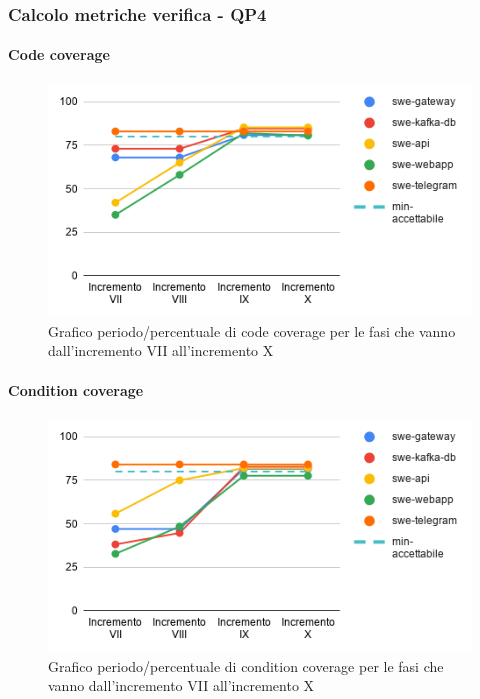 \subsubsection{Calcolo metriche verifica - QP4}	
\paragraph{Code coverage}
\begin{figure}[H]
			\centering
			\includegraphics[width=0.8\linewidth]{./res/images/QM-TEST-1-COCO.png}
			\caption{Grafico periodo/percentuale di code coverage per le fasi che vanno dall'incremento VII all'incremento X}
			\label{fig:Grafico periodo/percentuale di code coverage per le fasi che vanno dall'incremento VII all'incremento X}
	\end{figure}
\paragraph{Condition coverage}
\begin{figure}[H]
			\centering
			\includegraphics[width=0.8\linewidth]{./res/images/QM-TEST-2-CONCO.png}
			\caption{Grafico periodo/percentuale di condition coverage per le fasi che vanno dall'incremento VII all'incremento X}
			\label{fig:Grafico periodo/percentuale di condition coverage per le fasi che vanno dall'incremento VII all'incremento X}
	\end{figure}
